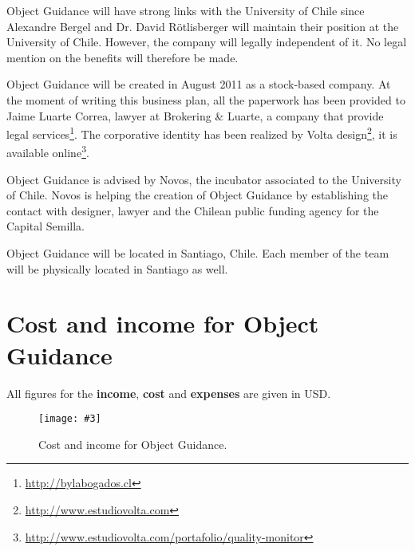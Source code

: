 \documentclass[runningheads]{llncs}
\newcommand{\fig}[4]{
	\begin{figure}[#1]
		\centering
		\texttt{[image: \#3]}
		\caption{\label{fig:#3}#4}
	\end{figure}}
\begin{document}
Object Guidance will have strong links with the University of Chile since Alexandre Bergel and Dr. David R\"otlisberger will maintain their position at the University of Chile. However, the company will legally independent of it. No legal mention on the benefits will therefore be made. 

Object Guidance will be created in August 2011 as a stock-based company. At the moment of writing this business plan, all the paperwork has been provided to Jaime Luarte Correa, lawyer at Brokering \& Luarte, a company that provide legal services\footnote{\url{http://bylabogados.cl}}. The corporative identity has been realized by Volta design\footnote{\url{http://www.estudiovolta.com}}, it is available online\footnote{\url{http://www.estudiovolta.com/portafolio/quality-monitor}}.

Object Guidance is advised by Novos, the incubator associated to the University of Chile. Novos is helping the creation of Object Guidance by establishing the contact with designer, lawyer and the Chilean public funding agency for the Capital Semilla.

Object Guidance will be located in Santiago, Chile. Each member of the team will be physically located in Santiago as well.




\appendix
\section{Cost and income for Object Guidance}

All figures for the \textbf{income}, \textbf{cost} and \textbf{expenses} are given in USD.

\fig{}{1.3}{incomeSheet}{Cost and income for Object Guidance.}
\end{document}
